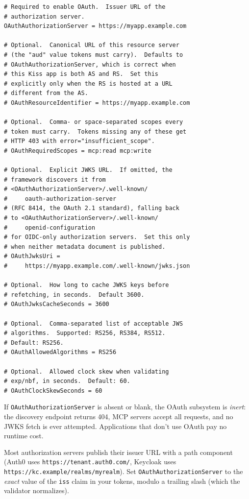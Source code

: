 \begin{lstlisting}[style=ini]
# Required to enable OAuth.  Issuer URL of the
# authorization server.
OAuthAuthorizationServer = https://myapp.example.com

# Optional.  Canonical URL of this resource server
# (the "aud" value tokens must carry).  Defaults to
# OAuthAuthorizationServer, which is correct when
# this Kiss app is both AS and RS.  Set this
# explicitly only when the RS is hosted at a URL
# different from the AS.
# OAuthResourceIdentifier = https://myapp.example.com

# Optional.  Comma- or space-separated scopes every
# token must carry.  Tokens missing any of these get
# HTTP 403 with error="insufficient_scope".
# OAuthRequiredScopes = mcp:read mcp:write

# Optional.  Explicit JWKS URL.  If omitted, the
# framework discovers it from
# <OAuthAuthorizationServer>/.well-known/
#     oauth-authorization-server
# (RFC 8414, the OAuth 2.1 standard), falling back
# to <OAuthAuthorizationServer>/.well-known/
#     openid-configuration
# for OIDC-only authorization servers.  Set this only
# when neither metadata document is published.
# OAuthJwksUri =
#     https://myapp.example.com/.well-known/jwks.json

# Optional.  How long to cache JWKS keys before
# refetching, in seconds.  Default 3600.
# OAuthJwksCacheSeconds = 3600

# Optional.  Comma-separated list of acceptable JWS
# algorithms.  Supported: RS256, RS384, RS512.
# Default: RS256.
# OAuthAllowedAlgorithms = RS256

# Optional.  Allowed clock skew when validating
# exp/nbf, in seconds.  Default: 60.
# OAuthClockSkewSeconds = 60
\end{lstlisting}

If \texttt{OAuthAuthorizationServer} is absent or blank, the OAuth subsystem is \emph{inert}: the discovery endpoint returns 404, MCP servers accept all requests, and no JWKS fetch is ever attempted.  Applications that don't use OAuth pay no runtime cost.

\begin{tipbox}
Most authorization servers publish their issuer URL with a path component (Auth0 uses \texttt{https://tenant.auth0.com/}, Keycloak uses \texttt{https://kc.example/realms/myrealm}).  Set \texttt{OAuthAuthorizationServer} to the \emph{exact} value of the \texttt{iss} claim in your tokens, modulo a trailing slash (which the validator normalizes).
\end{tipbox}

